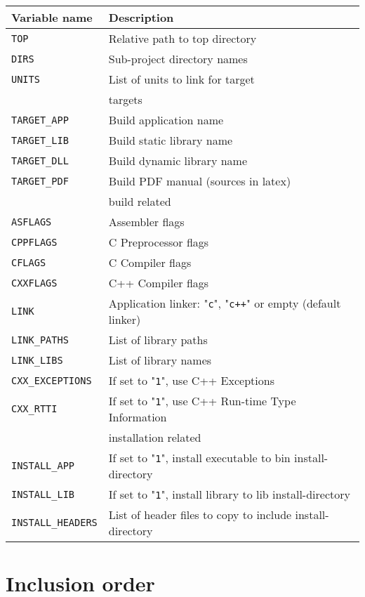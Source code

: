 \documentclass{article}
\newcommand{\var}[1]{{\tt #1}}
\newcommand{\val}[1]{"{\tt #1}"}
\begin{document}
\begin{tabular}{ll}
Variable name              & Description                       \\
\hline
\var{TOP}		   & Relative path to top directory    \\
\var{DIRS}		   & Sub-project directory names       \\
\var{UNITS}                & List of units to link for target      \\
\hline
& targets \\
\hline
\var{TARGET\_APP}           & Build application name              \\
\var{TARGET\_LIB}           & Build static library name           \\
\var{TARGET\_DLL}           & Build dynamic library name          \\
\var{TARGET\_PDF}	   & Build PDF manual (sources in latex) \\
\hline
& build related \\
\hline
\var{ASFLAGS}              & Assembler flags \\
\var{CPPFLAGS}		   & C Preprocessor flags \\
\var{CFLAGS}		   & C Compiler flags \\
\var{CXXFLAGS}		   & C++ Compiler flags \\
\var{LINK}                 & Application linker: \val{c}, \val{c++} or empty (default linker)\\
\var{LINK\_PATHS}	   & List of library paths \\
\var{LINK\_LIBS}	   & List of library names \\
\var{CXX\_EXCEPTIONS}      & If set to \val{1}, use C++ Exceptions                \\
\var{CXX\_RTTI}       	   & If set to \val{1}, use C++ Run-time Type Information \\
\hline
& installation related \\
\hline
\var{INSTALL\_APP}	   & If set to \val{1}, install executable to bin install-directory \\
\var{INSTALL\_LIB}	   & If set to \val{1}, install library to lib install-directory \\
\var{INSTALL\_HEADERS}    & List of header files to copy to include install-directory \\
\end{tabular}

\pagebreak

\section{Inclusion order}
\end{document}
